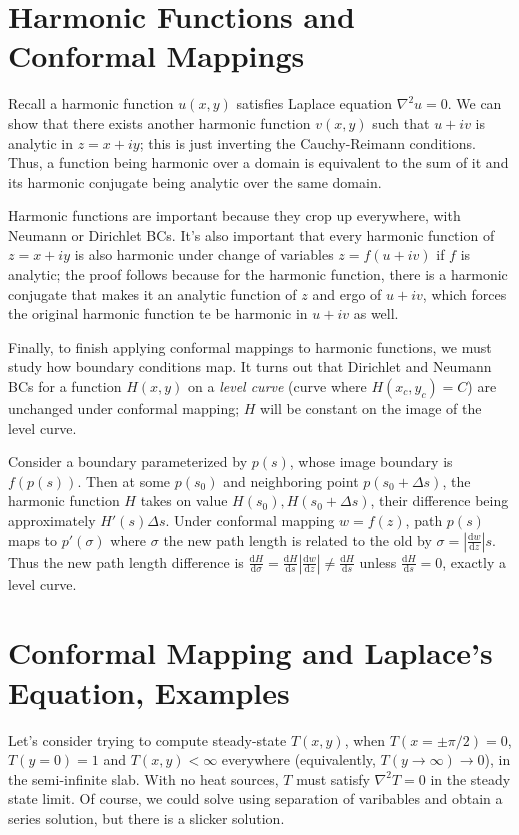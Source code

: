 \documentclass[12pt]{report}
\newcommand*{\rd}[2]{\frac{\mathrm{d}#1}{\mathrm{d}#2}}
\newcommand*{\abs}[1]{\left|#1\right|}
\begin{document}
\section{Harmonic Functions and Conformal Mappings}

Recall a harmonic function $u(x, y)$ satisfies Laplace equation $\nabla^2 u =
0$. We can show that there exists another harmonic function $v(x, y)$ such that
$u + iv$ is analytic in $z = x + iy$; this is just inverting the Cauchy-Reimann
conditions. Thus, a function being harmonic over a domain is equivalent to the
sum of it and its harmonic conjugate being analytic over the same domain.

Harmonic functions are important because they crop up everywhere, with Neumann
or Dirichlet BCs. It's also important that every harmonic function of $z = x +
iy$ is also harmonic under change of variables $z = f(u + iv)$ if $f$ is
analytic; the proof follows because for the harmonic function, there is a
harmonic conjugate that makes it an analytic function of $z$ and ergo of $u +
iv$, which forces the original harmonic function te be harmonic in $u + iv$ as
well.

Finally, to finish applying conformal mappings to harmonic functions, we must
study how boundary conditions map. It turns out that Dirichlet and Neumann BCs
for a function $H(x, y)$ on a \emph{level curve} (curve where $H(x_c, y_c) = C$)
are unchanged under conformal mapping; $H$ will be constant on the image of the
level curve.

Consider a boundary parameterized by $p(s)$, whose image boundary is $f(p(s))$.
Then at some $p(s_0)$ and neighboring point $p(s_0 + \Delta s)$, the harmonic
function $H$ takes on value $H(s_0), H(s_0 + \Delta s)$, their difference
being approximately $H'(s) \Delta s$. Under conformal mapping $w = f(z)$,
path $p(s)$ maps to $p'(\sigma)$ where $\sigma$ the new path length is related
to the old by $\sigma = \abs{\rd{w}{z}}s$. Thus the new path length difference
is $\rd{H}{\sigma} = \rd{H}{s}\abs{\rd{w}{z}} \neq \rd{H}{s}$ unless $\rd{H}{s}
= 0$, exactly a level curve.

\section{Conformal Mapping and Laplace's Equation, Examples}

Let's consider trying to compute steady-state $T(x, y)$, when $T(x = \pm \pi/2)
= 0$, $T(y = 0) = 1$ and $T(x, y) < \infty$ everywhere (equivalently, $T(y \to
\infty) \to 0$), in the semi-infinite slab. With no heat sources, $T$ must
satisfy $\nabla^2 T = 0$ in the steady state limit. Of course, we could solve
using separation of varibables and obtain a series solution, but there is a
slicker solution.
\end{document}
